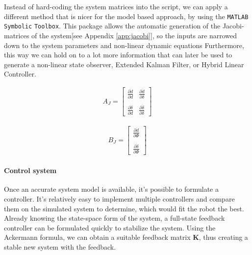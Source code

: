 Instead of hard-coding the system matrices into the script, we can apply a different method that is nicer for the model based approach, by using the \verb!MATLAB! \verb!Symbolic! \verb!Toolbox!. This package allows the automatic generation of the Jacobi-matrices of the system[see Appendix \ref{app:jacobi}], so the inputs are narrowed down to the system parameters and non-linear dynamic equations 
Furthermore, this way we can hold on to a lot more information that can later be used to generate a non-linear state observer, Extended Kalman Filter, or Hybrid Linear Controller.
     
\begin{minipage}{0.45\linewidth}
    \begin{align}
        A_J =
        \begin{bmatrix}
           \frac{\partial \dot{d}}{\partial d} & \frac{\partial \dot{d}}{\partial \delta} \\
           & \\
           \frac{\partial \dot{\delta}}{\partial d} & \frac{\partial \dot{\delta}}{\partial \delta}
         \end{bmatrix}
     \end{align}
\end{minipage}
\begin{minipage}{0.45\linewidth}
    \begin{align}
        B_J =
         \begin{bmatrix}
               \frac{\partial \dot{d}}{\partial \Phi} \\
               \\
               \frac{\partial \dot{\delta}}{\partial \Phi}
        \end{bmatrix}
     \end{align}
\end{minipage}

\paragraph{Control system}

Once an accurate system model is available, it's possible to formulate a controller. It's relatively easy to implement multiple controllers and compare them on the simulated system to determine, which would fit the robot the best.
Already knowing the state-space form of the system, a full-state feedback controller can be formulated quickly to stabilize the system. Using the Ackermann formula, we can obtain a suitable feedback matrix \textbf{K}, thus creating a stable new system with the feedback.

